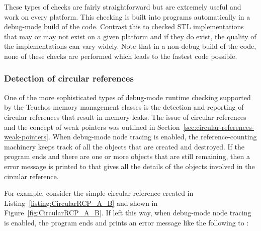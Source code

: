 \documentclass[pdf,ps2pdf,11pt]{SANDreport}
\begin{document}
These types of checks are fairly straightforward but are extremely
useful and work on every platform.  This checking is built into
programs automatically in a debug-mode build of the code.  Contrast
this to checked STL implementations that may or may not exist on a
given platform and if they do exist, the quality of the
implementations can vary widely.  Note that in a non-debug build of
the code, none of these checks are performed which leads to the
fastest code possible.


%
{}\subsubsection{Detection of circular references}
\label{sec:detection-circular-references}
%

One of the more sophisticated types of debug-mode runtime checking
supported by the Teuchos memory management classes is the detection
and reporting of circular {} references that result in memory
leaks.  The issue of circular references and the concept of weak
pointers was outlined in
Section~\ref{sec:circular-references-weak-pointers}.  When debug-mode
node tracing is enabled, the reference-counting machinery keeps track
of all the {} objects that are created and destroyed.  If
the program ends and there are one or more {} objects
that are still remaining, then a error message is printed to
{} that gives all the details of the objects involved
in the circular reference.

For example, consider the simple circular reference created in
Listing~\ref{listing:CircularRCP_A_B} and shown in
Figure~\ref{fig:CircularRCP_A_B}.  If left this way, when debug-mode
node tracing is enabled, the program ends and prints an error message
like the following to {}:
\end{document}
